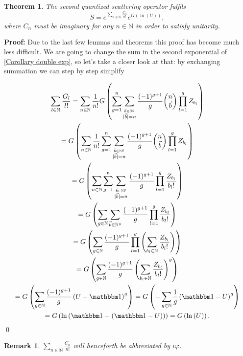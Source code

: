 \documentclass[b5paper,draft,openbib,12pt]{memoir}
\newtheorem{Thm}[Def]{Theorem}
\newtheorem{Remark}[Def]{Remark}
\newcommand{\id}{{\mathbbm 1}}
\begin{document}
\begin{Thm}\label{sleek_second_quantised_scattering_operator}
The second quantized scattering operator fulfils
\begin{equation}
S= e^{\sum_{n\in\mathbb{N}} \frac{C_n}{n!}} e^{G(\ln (U))},
\end{equation}
where \(C_n\) must be imaginary for any \(n\in\mathbb{N}\) in order to satisfy unitarity.
\end{Thm}
\textbf{Proof:} Due to the last few lemmas and theorems this proof has become much less difficult.
 We are going to change the sum in the second exponential of 
\eqref{Corollary double exp}, so let's take a closer look at that: by exchanging summation
we can step by step simplify

\begin{multline}
\sum_{l\in\mathbb{N}} \frac{G_{l}}{l!}= 
\sum_{n \in\mathbb{N}} \frac{1}{n!} 
G\left( \sum_{g=1}^n \sum_{\stackrel{\vec{b}\in\mathbb{N}^g}{|\vec{b}|=n}}\frac{(-1)^{g+1}}{g} 
\binom{n}{\vec{b}} \prod_{l=1}^g Z_{b_l}  \right)\\
=G\left( \sum_{n \in\mathbb{N}} \frac{1}{n!} 
 \sum_{g=1}^n \sum_{\stackrel{\vec{b}\in\mathbb{N}^g}{|\vec{b}|=n}}\frac{(-1)^{g+1}}{g} 
\binom{n}{\vec{b}} \prod_{l=1}^g Z_{b_l}  \right)\\
=G\left( \sum_{n \in\mathbb{N}}
 \sum_{g=1}^n \sum_{\stackrel{\vec{b}\in\mathbb{N}^g}{|\vec{b}|=n}}\frac{(-1)^{g+1}}{g} 
 \prod_{l=1}^g \frac{Z_{b_l}}{b_l!}  \right)\\
=G\left( 
 \sum_{g\in\mathbb{N}} \sum_{\vec{b}\in\mathbb{N}^g}\frac{(-1)^{g+1}}{g} 
\prod_{l=1}^g \frac{Z_{b_l}}{b_l!}  \right)\\
=G\left( 
 \sum_{g\in\mathbb{N}} \frac{(-1)^{g+1}}{g} 
\prod_{l=1}^g \left(\sum_{b_l\in\mathbb{N}} \frac{Z_{b_l}}{b_l!} \right) \right)\\
=G\left( 
 \sum_{g\in\mathbb{N}} \frac{(-1)^{g+1}}{g} 
 \left(\sum_{b_l\in\mathbb{N}} \frac{Z_{b_l}}{b_l!} \right)^g \right)\\
 =G\left( 
 \sum_{g\in\mathbb{N}} \frac{(-1)^{g+1}}{g} 
 \left(U-\id \right)^g \right)
 =G\left( -
 \sum_{g\in\mathbb{N}} \frac{1}{g} 
 \left(\id-U \right)^g \right)\\
  =G\left( 
 \ln \left(\id-\left(\id-U\right) \right) \right)
 =G\left( \ln \left(U\right)\right).
\end{multline}
\qed

\begin{Remark}
\(\sum_{n\in\mathbb{N}} \frac{C_n}{n!}\) will henceforth be abbreviated by \(i \varphi\).
\end{Remark}
\end{document}
